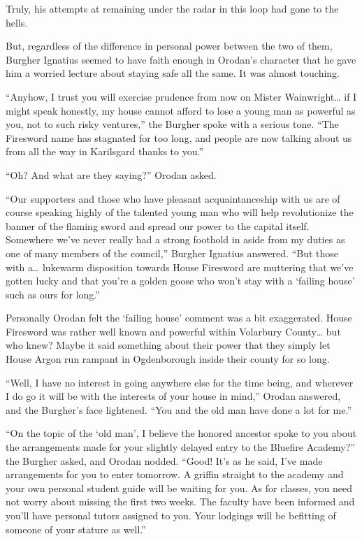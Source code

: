 \documentclass[a4paper,10pt]{book}
\begin{document}
Truly, his attempts at remaining under the radar in this loop had gone to the hells.\par
But, regardless of the difference in personal power between the two of them, Burgher Ignatius seemed to have faith enough in Orodan’s character that he gave him a worried lecture about staying safe all the same. It was almost touching.\par
“Anyhow, I trust you will exercise prudence from now on Mister Wainwright… if I might speak honestly, my house cannot afford to lose a young man as powerful as you, not to such risky ventures,” the Burgher spoke with a serious tone. “The Firesword name has stagnated for too long, and people are now talking about us from all the way in Karilsgard thanks to you.”\par
“Oh? And what are they saying?” Orodan asked.\par
“Our supporters and those who have pleasant acquaintanceship with us are of course speaking highly of the talented young man who will help revolutionize the banner of the flaming sword and spread our power to the capital itself. Somewhere we’ve never really had a strong foothold in aside from my duties as one of many members of the council,” Burgher Ignatius answered. “But those with a… lukewarm disposition towards House Firesword are muttering that we’ve gotten lucky and that you’re a golden goose who won’t stay with a ‘failing house' such as ours for long.”\par
Personally Orodan felt the ‘failing house’ comment was a bit exaggerated. House Firesword was rather well known and powerful within Volarbury County… but who knew? Maybe it said something about their power that they simply let House Argon run rampant in Ogdenborough inside their county for so long.\par
“Well, I have no interest in going anywhere else for the time being, and wherever I do go it will be with the interests of your house in mind,” Orodan answered, and the Burgher’s face lightened. “You and the old man have done a lot for me.”\par
“On the topic of the ‘old man’, I believe the honored ancestor spoke to you about the arrangements made for your slightly delayed entry to the Bluefire Academy?” the Burgher asked, and Orodan nodded. “Good! It’s as he said, I’ve made arrangements for you to enter tomorrow. A griffin straight to the academy and your own personal student guide will be waiting for you. As for classes, you need not worry about missing the first two weeks. The faculty have been informed and you’ll have personal tutors assigned to you. Your lodgings will be befitting of someone of your stature as well.”\par
\end{document}
